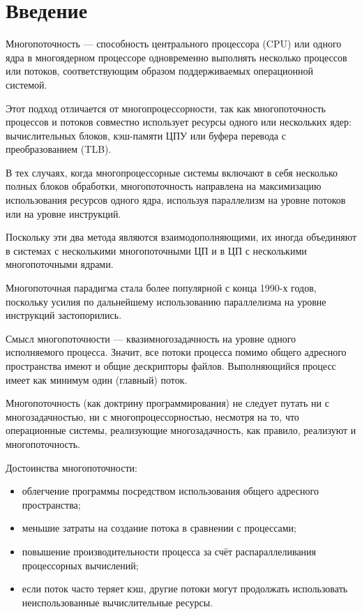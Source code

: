\documentclass[12pt]{report}
\begin{document}
    
    \tableofcontents

    \newpage
    \chapter*{Введение}

    Многопоточность — способность центрального процессора (CPU) или одного ядра
    в многоядерном процессоре одновременно выполнять несколько процессов или
    потоков, соответствующим образом поддерживаемых операционной системой.
    
    Этот подход отличается от многопроцессорности, так как многопоточность
    процессов и потоков совместно использует ресурсы одного или нескольких ядер:
    вычислительных блоков, кэш-памяти ЦПУ или буфера перевода с преобразованием (TLB).

    В тех случаях, когда многопроцессорные системы включают в себя несколько полных блоков обработки,
    многопоточность направлена на максимизацию использования ресурсов одного ядра,
    используя параллелизм на уровне потоков или на уровне инструкций.

    Поскольку эти два метода являются взаимодополняющими,
    их иногда объединяют в системах с несколькими многопоточными ЦП
    и в ЦП с несколькими многопоточными ядрами.

    Многопоточная парадигма стала более популярной с конца 1990-х годов,
    поскольку усилия по дальнейшему использованию параллелизма на уровне инструкций застопорились.

    Смысл многопоточности — квазимногозадачность на уровне одного исполняемого процесса.
    Значит, все потоки процесса помимо общего адресного пространства имеют и общие дескрипторы файлов.
    Выполняющийся процесс имеет как минимум один (главный) поток.

    Многопоточность (как доктрину программирования) не следует путать ни с многозадачностью,
    ни с многопроцессорностью, несмотря на то, что операционные системы,
    реализующие многозадачность, как правило, реализуют и многопоточность.

    Достоинства многопоточности:

    \begin{itemize}
        \item облегчение программы посредством использования общего адресного пространства;
        \item меньшие затраты на создание потока в сравнении с процессами;
        \item повышение производительности процесса за счёт распараллеливания процессорных вычислений;
        \item если поток часто теряет кэш, другие потоки могут продолжать
        использовать неиспользованные вычислительные ресурсы.
    \end{itemize}
\end{document}
